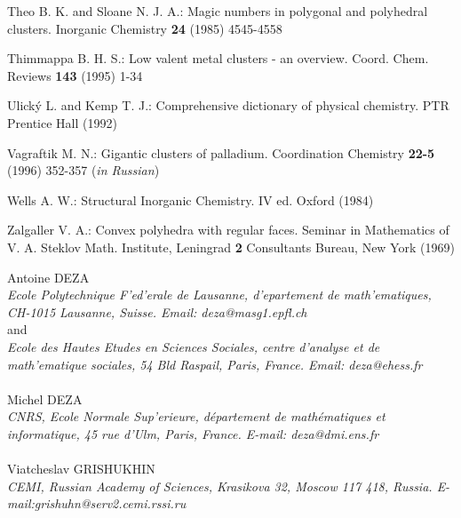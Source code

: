 \begin{thebibliography}{99}
Theo B. K. and Sloane N. J. A.:
Magic numbers in polygonal and polyhedral clusters.
Inorganic Chemistry {\bf 24} (1985) 4545-4558
\vspace{-3mm}

Thimmappa B. H. S.:
Low valent metal clusters - an overview.
Coord. Chem. Reviews {\bf 143} (1995) 1-34
\vspace{-3mm}

Ulick\'y L. and Kemp T. J.:
Comprehensive dictionary of physical chemistry. 
PTR Prentice Hall (1992)
\vspace{-3mm}

Vagraftik M. N.:
Gigantic clusters of palladium.
Coordination Chemistry {\bf 22-5} (1996) 352-357 ({\it in Russian})
\vspace{-3mm}

Wells A. W.: 
Structural Inorganic Chemistry. IV ed.
Oxford (1984) 
\vspace{-3mm}

Zalgaller V. A.: 
Convex polyhedra with regular faces.  
Seminar in Mathematics of V. A. Steklov Math. Institute, Leningrad {\bf 2}
Consultants Bureau, New York (1969)  
\vspace{-3mm}

\end{thebibliography} 


\vspace{5mm}
\noindent
{\small Antoine DEZA}\\
{\em Ecole Polytechnique F\a'ed\a'erale de Lausanne, d\a'epartement de
math\a'ematiques, CH-1015 Lausanne, Suisse. 
Email:  deza{\small @}masg1.epfl.ch}\\
and\\
{\em Ecole des Hautes Etudes en Sciences Sociales, 
centre d'analyse et de math\a'ematique sociales, 54 Bld Raspail, Paris, 
France.
Email:  deza{\small @}ehess.fr}\\\\
{\small Michel DEZA}\\
{\em CNRS, Ecole Normale Sup\a'erieure, d\'epartement
de math\'ematiques et informatique, 45 rue d'Ulm, Paris, France.
E-mail: deza{\small @}dmi.ens.fr}\\\\
{\small Viatcheslav GRISHUKHIN}\\
{\em CEMI, Russian Academy of Sciences, Krasikova 32, Moscow 117 418, Russia.
E-mail:\linebreak grishuhn{\small @}serv2.cemi.rssi.ru}

\listoffigures


